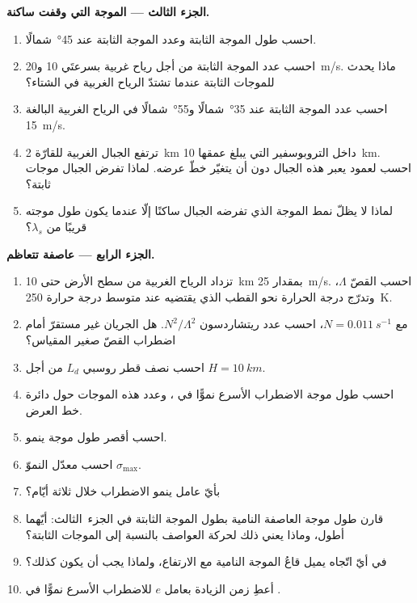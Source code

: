 \begin{problem}
\medskip\noindent\textbf{الجزء الثالث --- الموجة التي وقفت ساكنة.}
\begin{enumerate}[resume]
\item احسب طول الموجة الثابتة وعدد الموجة الثابتة عند
  \ang{45}~شمالًا.
\item احسب عدد الموجة الثابتة من أجل رياح غربية بسرعتَي 10 و\qty{20}{m/s}.
  ماذا يحدث للموجات الثابتة عندما تشتدّ الرياح الغربية
  في الشتاء؟
\item احسب عدد الموجة الثابتة عند \ang{35}~شمالًا و\ang{55}~شمالًا في
  الرياح الغربية البالغة \qty{15}{m/s}.
\item ترتفع الجبال الغربية للقارّة \qty{2}{km} داخل التروبوسفير
  التي يبلغ عمقها \qty{10}{km}. احسب  لعمود يعبر
  هذه الجبال دون أن يتغيّر خطّ عرضه.
  لماذا تفرض الجبال موجات ثابتة؟
\item لماذا لا يظلّ نمط الموجة الذي تفرضه الجبال ساكنًا
  إلّا عندما يكون طول موجته قريبًا من $\lambda_s$؟
\end{enumerate}

\medskip\noindent\textbf{الجزء الرابع --- عاصفة تتعاظم.}
\begin{enumerate}[resume]
\item تزداد الرياح الغربية من سطح الأرض حتى \qty{10}{km} بمقدار
  \qty{25}{m/s}. احسب القصّ $\Lambda$، وتدرّج درجة الحرارة نحو القطب الذي
  يقتضيه  عند متوسط درجة حرارة
  \qty{250}{K}.
\item مع $N = \qty{0.011}{s^{-1}}$، احسب عدد ريتشاردسون
  $N^2/\Lambda^2$. هل الجريان غير مستقرّ أمام اضطراب القصّ صغير المقياس؟
\item احسب نصف قطر روسبي $L_d$ من أجل $H = \qty{10}{km}$.
\item احسب طول موجة الاضطراب الأسرع نموًّا في ، وعدد هذه الموجات
  حول دائرة خط العرض.
\item احسب أقصر طول موجة ينمو.
\item احسب معدّل النموّ $\sigma_{\max}$.
\item بأيّ عامل ينمو الاضطراب خلال ثلاثة أيّام؟
\item قارن طول موجة العاصفة النامية بطول الموجة الثابتة في الجزء~الثالث:
  أيّهما أطول، وماذا يعني ذلك لحركة العواصف بالنسبة إلى الموجات
  الثابتة؟
\item في أيّ اتّجاه يميل قاعُ الموجة النامية مع الارتفاع،
  ولماذا يجب أن يكون كذلك؟
\item أعطِ زمن الزيادة بعامل $e$ للاضطراب الأسرع نموًّا في .
\end{enumerate}
\end{problem}
